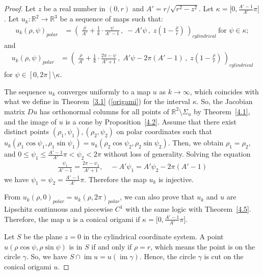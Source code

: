 \documentclass{amsart}
\theoremstyle{plain}
\theoremstyle{definition}
\theoremstyle{remark}
\DeclareMathOperator{\im}{im}
\begin{document}
\begin{proof}
Let $z$ be a real number in $(0,r)$ and $A'=r/\sqrt{r^2-z^2}$.
Let $\kappa=\bigl[0,\frac{A'-1}{A'}\pi\bigr]$.
Let $u_k \colon \mathbb{R}^2\to\mathbb{R}^3$ be a sequence of maps such that: 
\begin{align*}
u_k(\rho,\psi)_{polar} &=\left(\;\frac{\rho}{A'}+\frac1k\cdot\frac{\psi}{A'-1}\,,\;-A'\psi\,,\;z\left(1-\frac{\rho}{r}\right)\,\right)_{cylindrical}
\ \text{for }\psi\in\kappa; 
\end{align*} 
and
\begin{align*} 
u_k(\rho,\psi)_{polar} &=\left(\;\frac{\rho}{A'}+\frac1k\cdot\frac{2\pi-\psi}{A'+1}\,,\;A'\psi-2\pi(A'-1)\,,\;z\left(1-\frac{\rho}{r}\right)\,\right)_{cylindrical}
\end{align*}
for $ \psi\in[0,2\pi]\setminus\kappa$.

The sequence $u_k$ converges uniformly to a map $u$ as $k\to\infty$, which coincides with what we define in Theorem~\ref{3.1} (\ref{origami}) for the interval $\kappa$.
So, the Jacobian matrix $Du$ has orthonormal columns for all points of $\mathbb{R}^2\setminus\Sigma_u$ by Theorem~\ref{4.1}, and the image of $u$ is a cone by Proposition~\ref{4.2}.
Assume that 
there exist distinct points $(\rho_1,\psi_1),(\rho_2,\psi_2)$ on polar coordinates such that $u_k(\rho_1\cos\psi_1,\rho_1\sin\psi_1)=u_k(\rho_2\cos\psi_2,\rho_2\sin\psi_2)$.
Then, we obtain $\rho_1=\rho_2$, and $0\le\psi_1\le\frac{A'-1}{A'}\pi<\psi_2<2\pi$ without loss of generality.
Solving the equation
\begin{align*}
\frac{\psi_1}{A'-1}=\frac{2\pi-\psi_2}{A'+1},\quad-A'\psi_1=A'\psi_2-2\pi(A'-1)
\end{align*}
we have $\psi_1=\psi_2=\frac{A'-1}{A'}\pi$. Therefore the map $u_k$ is injective.

From $u_k(\rho,0)_{polar}=u_k(\rho,2\pi)_{polar}$, we can also prove that $u_k$ and $u$ are Lipschitz continuous and piecewise $C^1$ with the same logic with Theorem~\ref{4.5}.
Therefore, the map $u$ is a conical origami if $\kappa=\bigl[0,\frac{A'-1}{A'}\pi\bigr]$.

Let $S$ be the plane $z=0$ in the cylindrical coordinate system.
A point $u(\rho\cos\psi,\rho\sin\psi)$ is in $S$ if and only if $\rho=r$, which means the point is on the circle $\gamma$.
So, we have $S\cap\im u=u(\im\gamma)$.
Hence, the circle $\gamma$ is cut on the conical origami $u$.
\end{proof}
\end{document}
